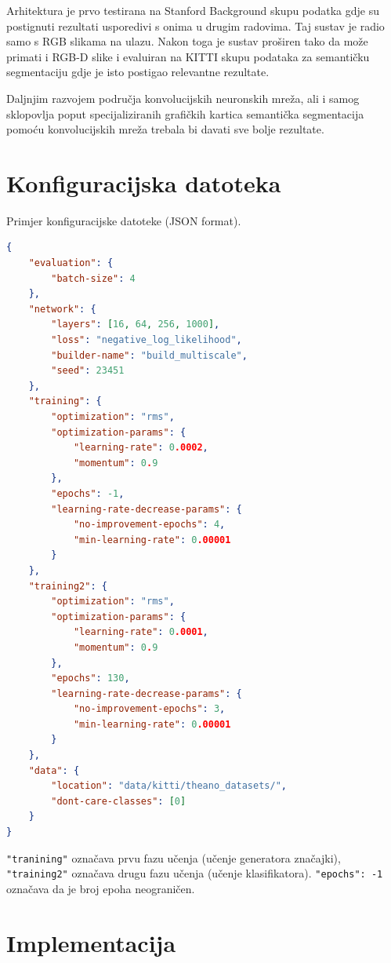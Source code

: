 \documentclass[times, utf8, diplomski, numeric]{fer}
\begin{document}
Arhitektura je prvo testirana na Stanford Background skupu podatka gdje su postignuti rezultati usporedivi s onima u drugim radovima. Taj sustav je radio samo s RGB slikama na ulazu. Nakon toga je sustav proširen tako da može primati i RGB-D slike i evaluiran na KITTI skupu podataka za semantičku segmentaciju gdje je isto postigao relevantne rezultate.

Daljnjim razvojem područja konvolucijskih neuronskih mreža, ali i samog sklopovlja poput specijaliziranih grafičkih kartica semantička segmentacija pomoću konvolucijskih mreža trebala bi davati sve bolje rezultate.




\appendix
\chapter{Konfiguracijska datoteka}
\label{chap:konfiguracijska datoteka}

Primjer konfiguracijske datoteke (JSON format).
\begin{lstlisting}[language=json]
{
    "evaluation": {
        "batch-size": 4
    },
    "network": {
        "layers": [16, 64, 256, 1000],
        "loss": "negative_log_likelihood",
        "builder-name": "build_multiscale",
        "seed": 23451
    },
    "training": {
        "optimization": "rms",
        "optimization-params": {
            "learning-rate": 0.0002,
            "momentum": 0.9
        },
        "epochs": -1,
        "learning-rate-decrease-params": {
            "no-improvement-epochs": 4,
            "min-learning-rate": 0.00001
        }
    },
    "training2": {
        "optimization": "rms",
        "optimization-params": {
            "learning-rate": 0.0001,
            "momentum": 0.9
        },
        "epochs": 130,
        "learning-rate-decrease-params": {
            "no-improvement-epochs": 3,
            "min-learning-rate": 0.00001
        }
    },
    "data": {
        "location": "data/kitti/theano_datasets/",
        "dont-care-classes": [0]
    }
}
\end{lstlisting}
\texttt{"tranining"} označava prvu fazu učenja (učenje generatora značajki), \texttt{"training2"} označava drugu fazu učenja (učenje klasifikatora). \texttt{"epochs": -1} označava da je broj epoha neograničen.

\chapter{Implementacija}
\end{document}
